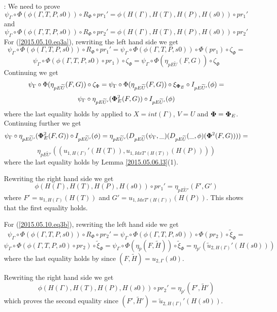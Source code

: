 \documentclass[12pt]{article}
\newenvironment{eq}{\begin{equation}}{\end{equation}}
\newenvironment{myproof}{{\bf Proof}:}{\vskip 5mm }
\newcommand{\llabel}[1]{\label{#1}}
\newcommand{\wt}{\widetilde}
\begin{document}
\begin{myproof}
We need to prove
%
\begin{eq}
\llabel{2015.05.10.eq3a}
\psi_{\Gamma}\circ \Phi(\phi(\Gamma,T,P,s0))\circ R_{\Phi}\circ pr_1' = \phi(H(\Gamma),H(T),H(P),H(s0))\circ pr_1'
\end{eq}
%
and
%
%
\begin{eq}
\llabel{2015.05.10.eq3b}
\psi_{\Gamma}\circ \Phi(\phi(\Gamma,T,P,s0))\circ R_{\Phi}\circ pr_2' = \phi(H(\Gamma),H(T),H(P),H(s0))\circ pr_2'
\end{eq}
%
For (\ref{2015.05.10.eq3a}), rewriting the left hand side we get
%
$$\psi_{\Gamma}\circ \Phi(\phi(\Gamma,T,P,s0))\circ R_{\Phi}\circ pr_1' = \psi_{\Gamma}\circ \Phi(\phi(\Gamma,T,P,s0))\circ\Phi(pr_1)\circ \zeta_{\Phi}=$$
$$\psi_{\Gamma}\circ \Phi(\phi(\Gamma,T,P,s0)\circ pr_1)\circ \zeta_{\Phi}=\psi_{\Gamma}\circ \Phi(\eta_{pE\wt{U}}(F,G))\circ \zeta_{\Phi}$$
%
Continuing we get
%
$$\psi_{\Gamma}\circ \Phi(\eta_{pE\wt{U}}(F,G))\circ \zeta_{\Phi}=\psi_{\Gamma}\circ \Phi(\eta_{pE\wt{U}}(F,G))\circ \xi_{{\bf \Phi}_E}\circ I_{pE\wt{U}'}(\phi)=$$
$$\psi_{\Gamma}\circ\eta_{pE\wt{U}'}({\bf\Phi}^2_E(F,G))\circ I_{pE\wt{U}'}(\phi)$$
%
where the last equality holds by \cite[Lemma 5.8]{fromunivwithPi} applied to $X=int(\Gamma)$, $V=U$ and ${\bf\Phi}={\bf\Phi}_E$. Continuing further we get
%
$$\psi_{\Gamma}\circ\eta_{pE\wt{U}'}({\bf\Phi}^2_E(F,G))\circ I_{pE\wt{U}'}(\phi)=\eta_{pE\wt{U}'}(D_{pE\wt{U}}(\psi_{\Gamma},\_)(D_{pE\wt{U}}(\_,\phi)({\bf\Phi}^2(F,G))))=$$$$\eta_{pE\wt{U}'}((u_{1,H(\Gamma)}'(H(T)),u_{1,IdxT'(H(T))}(H(P))))$$
%
where the last equality holds by Lemma \ref{2015.05.06.l3}(1). 

Rewriting the right hand side we get
%
$$\phi(H(\Gamma),H(T),H(P),H(s0))\circ pr_1'=\eta_{pE\wt{U}'}(F',G')$$
%
where $F'=u_{1,H(\Gamma)}(H(T))$ and $G'=u_{1,IdxT'(H(\Gamma))}(H(P))$. 
This shows that the first equality holds.

For (\ref{2015.05.10.eq3b}), rewriting the left hand side we get
%
$$\psi_{\Gamma}\circ \Phi(\phi(\Gamma,T,P,s0))\circ R_{\Phi}\circ pr_2' = \psi_{\Gamma}\circ \Phi(\phi(\Gamma,T,P,s0))\circ \Phi(pr_2)\circ \wt{\xi}_{\Phi}=$$
$$\psi_{\Gamma}\circ \Phi(\phi(\Gamma,T,P,s0)\circ pr_2)\circ \wt{\xi}_{\Phi}=\psi_{\Gamma}\circ \Phi(\eta_p(F,\wt{H}))\circ \wt{\xi}_{\Phi}=\eta_{p'}(\wt{u}_{2,H(\Gamma)}'(H(s0)))$$
%
where the last equality holds by \cite[Lemma 6.2(2)]{fromunivwithPi} since $(F,\wt{H})=u_{2,\Gamma}(s0)$. 

Rewriting the right hand side we get
%
$$\phi(H(\Gamma),H(T),H(P),H(s0))\circ pr_2'=\eta_{p'}(F',\wt{H}')$$
%
which proves the second equality since $(F',\wt{H}')=\wt{u}_{2,H(\Gamma)}'(H(s0))$.
\end{myproof}
\end{document}

